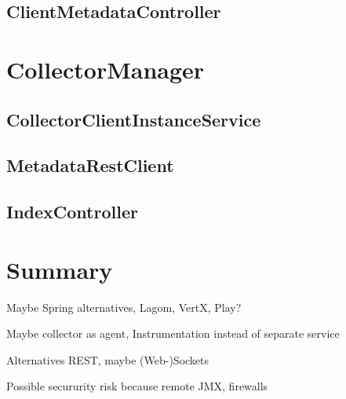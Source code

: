 \subsection{ClientMetadataController}

\section{CollectorManager}

\subsection{CollectorClientInstanceService}

\subsection{MetadataRestClient}

\subsection{IndexController}

\section{Summary}


Maybe Spring alternatives, Lagom, VertX, Play?

Maybe collector as agent, Instrumentation instead of separate service

Alternatives REST, maybe (Web-)Sockets

Possible secururity risk because remote JMX, firewalls
